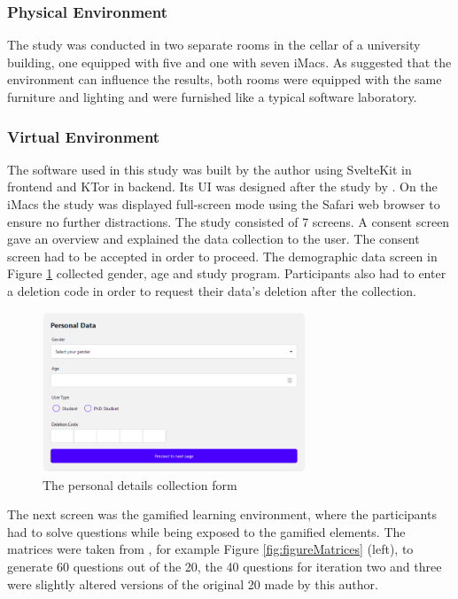 \subsubsection{Physical Environment}
The study was conducted in two separate rooms in the cellar of a university building, one equipped with five and one with seven iMacs.
As \textcite{christyLeaderboardsVirtualClassroom2014} suggested that the environment can influence the results, both rooms were equipped with the same furniture and lighting and were furnished like a typical software laboratory.

\subsubsection{Virtual Environment}
The software used in this study was built by the author using SvelteKit in frontend and KTor in backend. Its UI was designed after the study by \textcite{albuquerqueDoesGenderStereotype2017}.
On the iMacs the study was displayed full-screen mode using the Safari web browser to ensure no further distractions. The study consisted of 7 screens.
A consent screen gave an overview and explained the data collection to the user. The consent screen had to be accepted in order to proceed.
The demographic data screen in Figure \ref{fig:figureDetails} collected gender, age and study program. Participants also had to enter a deletion code in order to request their data's deletion after the collection.
\begin{figure}[H]
  \centering
  \includegraphics[width=0.7\textwidth]{img/details.png}
  \caption{The personal details collection form}
  \label{fig:figureDetails}
\end{figure}
The next screen was the gamified learning environment, where the participants had to solve questions while being exposed to the gamified elements.
The matrices were taken from \textcite{albuquerqueDoesGenderStereotype2017}, for example Figure \ref{fig:figureMatrices} (left), to generate 60 questions out of the 20, the 40 questions for iteration two and three were slightly altered versions of the original 20 made by this author.
